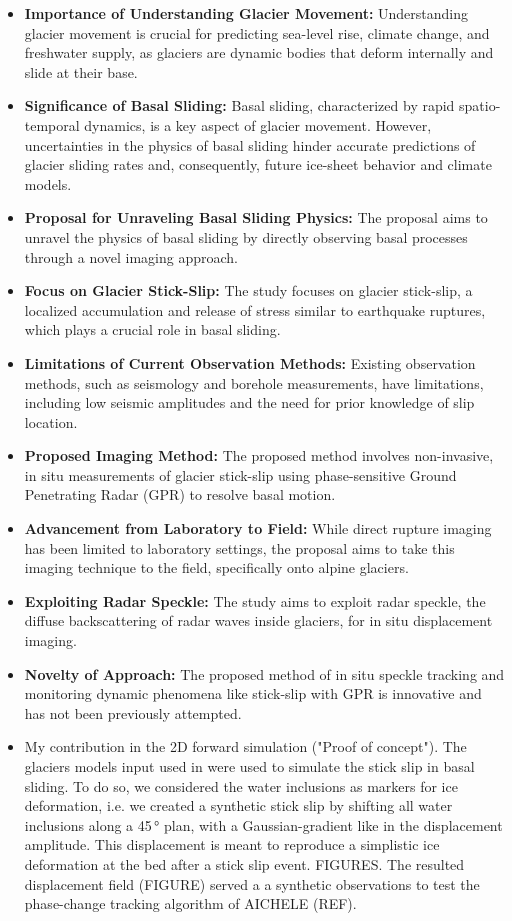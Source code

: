 \begin{itemize}
    \item \textbf{Importance of Understanding Glacier Movement:} Understanding glacier movement is crucial for predicting sea-level rise, climate change, and freshwater supply, as glaciers are dynamic bodies that deform internally and slide at their base.
    \item \textbf{Significance of Basal Sliding:} Basal sliding, characterized by rapid spatio-temporal dynamics, is a key aspect of glacier movement. However, uncertainties in the physics of basal sliding hinder accurate predictions of glacier sliding rates and, consequently, future ice-sheet behavior and climate models.
    \item \textbf{Proposal for Unraveling Basal Sliding Physics:} The proposal aims to unravel the physics of basal sliding by directly observing basal processes through a novel imaging approach.
    \item \textbf{Focus on Glacier Stick-Slip:} The study focuses on glacier stick-slip, a localized accumulation and release of stress similar to earthquake ruptures, which plays a crucial role in basal sliding.
    \item \textbf{Limitations of Current Observation Methods:} Existing observation methods, such as seismology and borehole measurements, have limitations, including low seismic amplitudes and the need for prior knowledge of slip location.
    \item \textbf{Proposed Imaging Method:} The proposed method involves non-invasive, in situ measurements of glacier stick-slip using phase-sensitive Ground Penetrating Radar (GPR) to resolve basal motion.
    \item \textbf{Advancement from Laboratory to Field:} While direct rupture imaging has been limited to laboratory settings, the proposal aims to take this imaging technique to the field, specifically onto alpine glaciers.
    \item \textbf{Exploiting Radar Speckle:} The study aims to exploit radar speckle, the diffuse backscattering of radar waves inside glaciers, for in situ displacement imaging.
    \item \textbf{Novelty of Approach:} The proposed method of in situ speckle tracking and monitoring dynamic phenomena like stick-slip with GPR is innovative and has not been previously attempted.
    \item My contribution in the 2D forward simulation ("Proof of concept").
    The glaciers models input used in \cite{Ogier&al2023} were used to simulate the stick slip in basal sliding. To do so, we considered the water inclusions as markers for ice deformation, i.e. we created a synthetic stick slip by shifting all water inclusions along a 45\,° plan, with a Gaussian-gradient like in the displacement amplitude. This displacement is meant to reproduce a simplistic ice deformation at the bed after a stick slip event. FIGURES. The resulted displacement field (FIGURE) served a a synthetic observations to test the phase-change tracking algorithm of AICHELE (REF).


\end{itemize}
